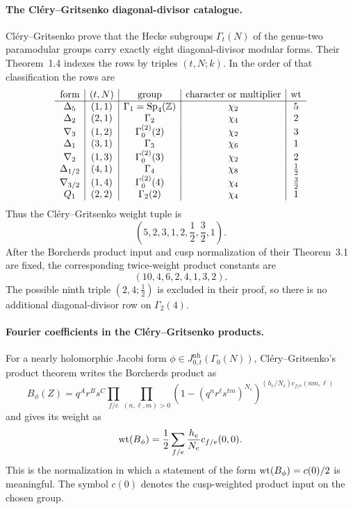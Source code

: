 \paragraph{The Cl\'ery--Gritsenko diagonal-divisor catalogue.}
Cl\'ery--Gritsenko prove that the Hecke subgroups \(\Gamma_t(N)\) of
the genus-two paramodular groups carry exactly eight
diagonal-divisor modular forms.  Their Theorem~1.4 indexes the rows by
triples \((t,N;k)\).  In the order of that classification the rows are
\[
\begin{array}{c|c|c|c|c}
\text{form} & (t,N) & \text{group} & \text{character or multiplier}
& \operatorname{wt} \\
\hline
\Delta_5 & (1,1) & \Gamma_1=\mathrm{Sp}_4(\mathbb{Z}) & \chi_2 & 5\\
\Delta_2 & (2,1) & \Gamma_2 & \chi_4 & 2\\
\nabla_3 & (1,2) & \Gamma_0^{(2)}(2) & \chi_2 & 3\\
\Delta_1 & (3,1) & \Gamma_3 & \chi_6 & 1\\
\nabla_2 & (1,3) & \Gamma_0^{(2)}(3) & \chi_2 & 2\\
\Delta_{1/2} & (4,1) & \Gamma_4 & \chi_8 & \frac12\\
\nabla_{3/2} & (1,4) & \Gamma_0^{(2)}(4) & \chi_4 & \frac32\\
Q_1 & (2,2) & \Gamma_2(2) & \chi_4 & 1
\end{array}
\]
Thus the Cl\'ery--Gritsenko weight tuple is
\[
  \left(5,2,3,1,2,\frac12,\frac32,1\right).
\]
After the Borcherds product input and cusp normalization of their
Theorem~3.1 are fixed, the corresponding twice-weight product constants
are
\[
  \left(10,4,6,2,4,1,3,2\right).
\]
The possible ninth triple \((2,4;\frac12)\) is excluded in their proof,
so there is no additional diagonal-divisor row on \(\Gamma_2(4)\).

\paragraph{Fourier coefficients in the Cl\'ery--Gritsenko products.}
For a nearly holomorphic Jacobi form \(\phi\in
J^{\mathrm{nh}}_{0,t}(\Gamma_0(N))\), Cl\'ery--Gritsenko's product
theorem writes the Borcherds product as
\[
  B_\phi(Z)=q^Ar^Bs^C
  \prod_{f/e}
  \prod_{(n,\ell,m)>0}
  \left(1-(q^nr^\ell s^{tm})^{N_e}\right)^{
  (h_e/N_e)c_{f/e}(nm,\ell)}
\]
and gives its weight as
\[
  \operatorname{wt}(B_\phi)
  =
  \frac12\sum_{f/e}\frac{h_e}{N_e}c_{f/e}(0,0).
\]
This is the normalization in which a statement of the form
\(\operatorname{wt}(B_\phi)=c(0)/2\) is meaningful.  The symbol \(c(0)\) denotes the
cusp-weighted product input on the chosen group.

